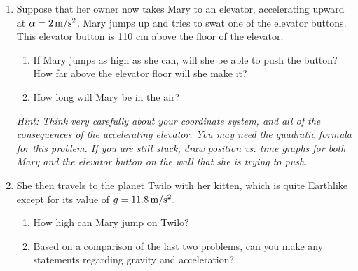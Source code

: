\documentclass[12pt]{article}
\begin{document}
\begin{enumerate}
\item Suppose that her owner now takes Mary to an elevator, accelerating upward at $\alpha=2\, \rm m/\rm s^2$. Mary jumps up and tries to swat one of the elevator buttons. This elevator button is 110 cm above the floor of the 
	elevator.

\begin{enumerate}
\item If Mary jumps as high as she can, will she be able to push the button? How far above the elevator floor will she make it?
\item How long will Mary be in the air?
\end{enumerate}

{\it Hint: Think very carefully about your coordinate system, and all of the consequences of the accelerating elevator. You may need the quadratic formula for this problem. If you are still stuck, draw position vs. time graphs for 
		both Mary and the elevator button on the wall that she is trying to push.}


\item She then travels to the planet Twilo with her kitten, which is quite Earthlike except for its value of $g=11.8\, \rm m/\rm s^2.$

\begin{enumerate}
\item How high can Mary jump on Twilo?
\item Based on a comparison of the last two problems, can you make any statements regarding gravity and acceleration?
\end{enumerate}

%
%


\bigskip


%
%
%
%
%



\end{enumerate}
\end{document}
